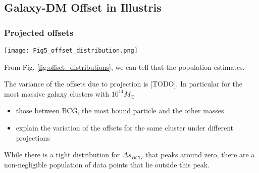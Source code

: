 \subsection{Galaxy-DM Offset in Illustris}

\subsubsection{Projected offsets}
\begin{figure*}
	\begin{center}
	\texttt{[image: Fig5\_offset\_distribution.png]}
	\caption{ 		
		The distribution of different offsets of [TODO] clusters with [TODO]
		projections. The dark blue area indicates the 68\% confidence interval
		while the light blue area shows the 95\% confidence interval. 
		We provide two ways of summarizing the offsets, the {\bf left column} shows
		the offsets when we randomly denote the sign of the offset. The
		direction of the offset in the Illustris simulation without SIDM has no 
		physical meaning.
		The estimates of the offsets on the left are all consistent with 0 within
		the 68\% confidence interval.
		On the {\bf right column}, we plot {\it the same data} after taking the
		absolute magnitude. The estimates from the absolute magnitude of the
		offsets are pushed towards larger values due to the cutoff at zero from
		taking the absolute values. None of the estimates from the
		absolute offsets is consistent with 0 within the 68\% interval.
				\label{fig:offset_distributions}
	}
\end{center}
\end{figure*}

From Fig. \ref{fig:offset_distributions}, we can tell that the population 
estimates. 

The variance of the offsets due to projection is [TODO].
In particular for the most massive galaxy clusters with $10^{14} M_{\odot}$



\begin{itemize}
\item those between BCG, the most bound particle and the other masses. 
\item explain the variation of the offsets for the same cluster under different 
projections 
\end{itemize}

While there is a tight distribution for $\Delta s_{BCG}$ that peaks around
zero, there are a non-negligible population of data points that lie outside
this peak. 

